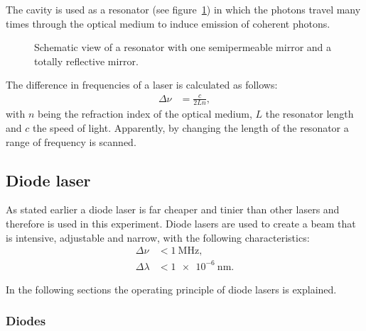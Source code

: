 The cavity is used as a resonator (see figure~\ref{fig:resonator}) in which the photons
travel many times through the optical medium to induce emission of coherent photons.

\begin{figure}[ht]
  \centering
  
  \caption{Schematic view of a resonator with one semipermeable mirror and a totally reflective
  mirror\cite{anleitung_hene}.}%
  \label{fig:resonator}
\end{figure}

The difference in frequencies of a laser is calculated as follows:
\begin{align}\label{eq:free_spectral_range}
  \Delta \nu &= \frac{c}{2Ln},
\end{align}
with $n$ being the refraction index of the optical medium, $L$ the resonator length
and $c$ the speed of light.
Apparently, by changing the length of the resonator a range of frequency is scanned.


\subsection{Diode laser}\label{diode-laser}
As stated earlier a diode laser is far cheaper and tinier than other lasers and therefore is used in this
experiment.
Diode lasers are used to create a beam that is intensive, adjustable and narrow,
with the following characteristics:
\begin{align}
  \Delta \nu &< \SI{1}{\mega\hertz}, \\
  \Delta \lambda &< \SI{1e-6}{\nano\meter}.
\end{align}

In the following sections the operating principle of diode lasers is explained.

\subsubsection{Diodes}\label{diodes}

